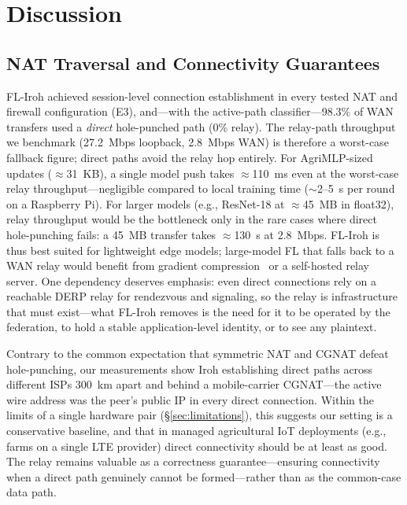 \documentclass[a4paper,fleqn]{cas-dc}
\begin{document}
\section{Discussion}
\label{sec:discussion}

\subsection{NAT Traversal and Connectivity Guarantees}

FL-Iroh achieved session-level connection establishment in every tested NAT and firewall configuration (E3), and---with the active-path classifier---98.3\% of WAN transfers used a \emph{direct} hole-punched path (0\% relay). The relay-path throughput we benchmark (27.2~Mbps loopback, 2.8~Mbps WAN) is therefore a worst-case fallback figure; direct paths avoid the relay hop entirely. For AgriMLP-sized updates ($\approx$31~KB), a single model push takes $\approx$110~ms even at the worst-case relay throughput---negligible compared to local training time ($\sim$2--5~s per round on a Raspberry Pi). For larger models (e.g., ResNet-18 at $\approx$45~MB in float32), relay throughput would be the bottleneck only in the rare cases where direct hole-punching fails: a 45~MB transfer takes $\approx$130~s at 2.8~Mbps. FL-Iroh is thus best suited for lightweight edge models; large-model FL that falls back to a WAN relay would benefit from gradient compression~\cite{konecny2016} or a self-hosted relay server. One dependency deserves emphasis: even direct connections rely on a reachable DERP relay for rendezvous and signaling, so the relay is infrastructure that must exist---what FL-Iroh removes is the need for it to be operated by the federation, to hold a stable application-level identity, or to see any plaintext.

Contrary to the common expectation that symmetric NAT and CGNAT defeat hole-punching, our measurements show Iroh establishing direct paths across different ISPs 300~km apart and behind a mobile-carrier CGNAT---the active wire address was the peer's public IP in every direct connection. Within the limits of a single hardware pair (\S\ref{sec:limitations}), this suggests our setting is a conservative baseline, and that in managed agricultural IoT deployments (e.g., farms on a single LTE provider) direct connectivity should be at least as good. The relay remains valuable as a correctness guarantee---ensuring connectivity when a direct path genuinely cannot be formed---rather than as the common-case data path.
\end{document}

